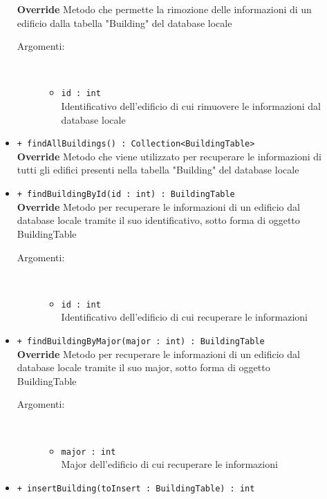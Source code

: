 \documentclass[../DefinizioneDiProdotto.tex]{subfiles}
\begin{document}
\begin{description}
\begin{itemize}
		\textbf{Override} Metodo che permette la rimozione delle informazioni di un edificio dalla tabella "Building" del database locale 
		\begin{description}
			\item[Argomenti:] \
			\begin{itemize}
				\item \texttt{id : int}\\
				Identificativo dell'edificio di cui rimuovere le informazioni dal database locale\end{itemize}
		\end{description}
		\item \texttt{+ findAllBuildings() : Collection<BuildingTable>}\\
		\textbf{Override} Metodo che viene utilizzato per recuperare le informazioni di tutti gli edifici presenti nella tabella "Building" del database locale
		\item \texttt{+ findBuildingById(id : int) : BuildingTable}\\
		\textbf{Override} Metodo per recuperare le informazioni di un edificio dal database locale tramite il suo identificativo, sotto forma di oggetto BuildingTable
		\begin{description}
			\item[Argomenti:] \
			\begin{itemize}
				\item \texttt{id : int}\\
				Identificativo dell'edificio di cui recuperare le informazioni\end{itemize}
		\end{description}
		\item \texttt{+ findBuildingByMajor(major : int) : BuildingTable}\\
		\textbf{Override} Metodo per recuperare le informazioni di un edificio dal database locale tramite il suo major, sotto forma di oggetto BuildingTable
		\begin{description}
			\item[Argomenti:] \
			\begin{itemize}
				\item \texttt{major : int}\\
				Major dell'edificio di cui recuperare le informazioni\end{itemize}
		\end{description}
		\item \texttt{+ insertBuilding(toInsert : BuildingTable) : int}\\

\end{itemize}
\end{description}
\end{document}
